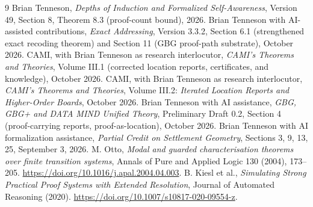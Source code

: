 \documentclass[11pt,letterpaper]{article}
\theoremstyle{definition}
\begin{document}
\begin{thebibliography}{9}
 Brian Tenneson, \emph{Depths of Induction and Formalized Self-Awareness}, Version 49, Section 8, Theorem 8.3 (proof-count bound), 2026.
 Brian Tenneson with AI-assisted contributions, \emph{Exact Addressing}, Version 3.3.2, Section 6.1 (strengthened exact recoding theorem) and Section 11 (GBG proof-path substrate), October 2026.
 CAMI, with Brian Tenneson as research interlocutor, \emph{CAMI's Theorems and Theories}, Volume III.1 (corrected location reports, certificates, and knowledge), October 2026.
 CAMI, with Brian Tenneson as research interlocutor, \emph{CAMI's Theorems and Theories}, Volume III.2: \emph{Iterated Location Reports and Higher-Order Boards}, October 2026.
 Brian Tenneson with AI assistance, \emph{GBG, GBG+ and DATA MIND Unified Theory}, Preliminary Draft 0.2, Section 4 (proof-carrying reports, proof-as-location), October 2026.
 Brian Tenneson with AI formalization assistance, \emph{Partial Credit on Settlement Geometry}, Sections 3, 9, 13, 25, September 3, 2026.
 M. Otto, \emph{Modal and guarded characterisation theorems over finite transition systems}, Annals of Pure and Applied Logic 130 (2004), 173--205. \url{https://doi.org/10.1016/j.apal.2004.04.003}.
 B. Kiesl et al., \emph{Simulating Strong Practical Proof Systems with Extended Resolution}, Journal of Automated Reasoning (2020). \url{https://doi.org/10.1007/s10817-020-09554-z}.
\end{thebibliography}
\end{document}
